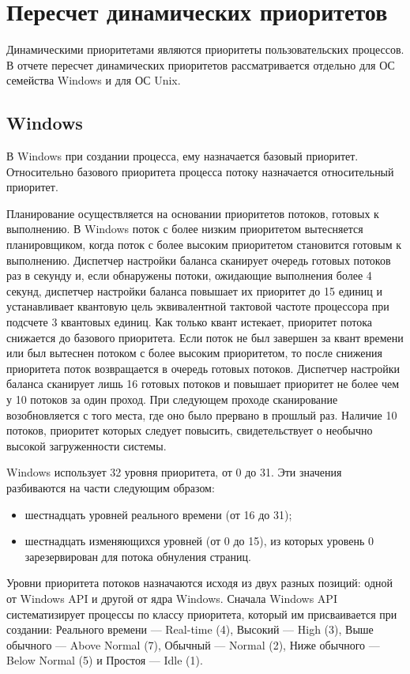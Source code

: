 \chapter{Пересчет динамических приоритетов}

Динамическими приоритетами являются приоритеты пользовательских процессов. 
В отчете пересчет динамических приоритетов рассматривается отдельно для ОС семейства Windows и для ОС Unix.

\section{Windows}

В Windows при создании процесса, ему назначается базовый приоритет. Относительно
базового приоритета процесса потоку назначается относительный приоритет.

Планирование осуществляется на основании приоритетов потоков, готовых к выполнению. В Windows поток с более низким приоритетом вытесняется планировщиком, когда поток с более высоким приоритетом становится готовым к выполнению. Диспетчер настройки
баланса сканирует очередь готовых потоков раз в секунду и, если обнаружены потоки, ожидающие выполнения более 4 секунд, диспетчер настройки баланса повышает их приоритет
до 15 единиц и устанавливает квантовую цель эквивалентной тактовой частоте процессора
при подсчете 3 квантовых единиц. Как только квант истекает, приоритет потока снижается
до базового приоритета. Если поток не был завершен за квант времени или был вытеснен
потоком с более высоким приоритетом, то после снижения приоритета поток возвращается в
очередь готовых потоков. Диспетчер настройки баланса сканирует лишь 16 готовых потоков
и повышает приоритет не более чем у 10 потоков за один проход. При следующем проходе
сканирование возобновляется с того места, где оно было прервано в прошлый раз. Наличие 10 потоков, приоритет которых следует повысить, свидетельствует о необычно высокой
загруженности системы.

\newpage
Windows использует 32 уровня приоритета, от 0 до 31. Эти значения разбиваются на части следующим образом:
\begin{itemize}
	\item шестнадцать уровней реального времени (от 16 до 31);
	\item шестнадцать изменяющихся уровней (от 0 до 15), из которых уровень 0 зарезервирован
	для потока обнуления страниц.
\end{itemize}

Уровни приоритета потоков назначаются исходя из двух разных позиций: одной от Windows
API и другой от ядра Windows. Сначала Windows API систематизирует процессы по классу
приоритета, который им присваивается при создании: Реального времени — Real-time (4),
Высокий — High (3), Выше обычного — Above Normal (7), Обычный — Normal (2), Ниже
обычного — Below Normal (5) и Простоя — Idle (1). 


